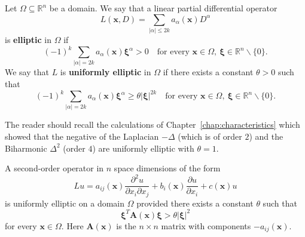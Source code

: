 \begin{Definition}
\label{def:positive-sign-elliptic-and-uniform-elliptic}
Let $\Omega\subseteq\mathbb{R}^n$ be a domain. We say that a linear partial differential operator
\begin{equation}\label{eq:even-order-elliptic-differential-operator}
L(\bm{x},D)=\sum_{|\alpha|\leq2k}a_\alpha(\bm{x})D^\alpha
\end{equation}
is \textbf{elliptic} in $\Omega$ if
\begin{equation}\label{eq:positive-sign-ellipticity-condition}
(-1)^k\sum_{|\alpha|=2k}a_\alpha(\bm{x})\bm{\xi}^\alpha>0\quad\text{for every }\bm{x}\in\Omega,\ \bm{\xi}\in\mathbb{R}^n\backslash\{0\}.
\end{equation}
We say that $L$ is \textbf{uniformly elliptic} in $\Omega$ if there exists a constant $\theta>0$ such that
\begin{equation}\label{eq:uniform-ellipticity-principal-symbol-bound}
(-1)^k\sum_{|\alpha|=2k}a_\alpha(\bm{x})\bm{\xi}^\alpha\geq\theta|\bm{\xi}|^{2k}\quad\text{for every }\bm{x}\in\Omega,\ \bm{\xi}\in\mathbb{R}^n\backslash\{0\}.
\end{equation}

\end{Definition}

\begin{Example}
\label{ex:laplacian-biharmonic-uniform-ellipticity}
The reader should recall the calculations of Chapter~\ref{chap:characteristics} which showed that the negative of the Laplacian $-\Delta$ (which is of order $2$) and the Biharmonic $\Delta^2$ (order $4$) are uniformly elliptic with $\theta=1$.
\end{Example}

\begin{Example}
\label{ex:second-order-negative-matrix-uniform-ellipticity}
A second-order operator in $n$ space dimensions of the form
\begin{equation}\label{eq:second-order-elliptic-nondivergence-operator}
Lu=a_{ij}(\bm{x})\frac{\partial^2u}{\partial x_i\partial x_j}+b_i(\bm{x})\frac{\partial u}{\partial x_i}+c(\bm{x})u
\end{equation}
is uniformly elliptic on a domain $\Omega$ provided there exists a constant $\theta$ such that
\begin{equation}\label{eq:second-order-ellipticity-negative-coefficient-matrix}
\bm{\xi}^T\bm{A}(\bm{x})\bm{\xi}>\theta|\bm{\xi}|^2
\end{equation}
for every $\bm{x}\in\Omega$. Here $\bm{A}(\bm{x})$ is the $n\times n$ matrix with components $-a_{ij}(\bm{x})$.
\end{Example}

